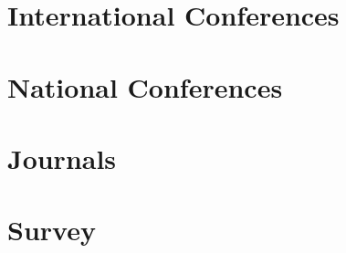 \section*{International Conferences}

\section*{National Conferences}

\section*{Journals}

\section*{Survey}
